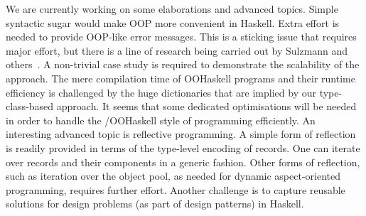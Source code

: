We are currently working on some elaborations and advanced topics.
Simple syntactic sugar would make OOP more convenient in Haskell.
Extra effort is needed to provide OOP-like error messages.  This is a
sticking issue that requires major effort, but there is a line of
research being carried out by Sulzmann and others~\cite{SSW04}. A
non-trivial case study is required to demonstrate the scalability of
the approach. The mere compilation time of OOHaskell programs and
their runtime efficiency is challenged by the huge dictionaries that
are implied by our type-class-based approach.  It seems that some
dedicated optimisations will be needed in order to handle the
\HList/OOHaskell style of programming efficiently. An interesting
advanced topic is reflective programming. A simple form of reflection
is readily provided in terms of the type-level encoding of
records. One can iterate over records and their components in a
generic fashion. Other forms of reflection, such as iteration over the
object pool, as needed for dynamic aspect-oriented programming,
requires further effort. Another challenge is to capture reusable
solutions for design problems (as part of design patterns) in Haskell.



